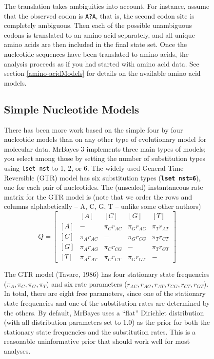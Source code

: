 \documentclass[12pt]{book}
\newcommand{\ttt}[1]{\texttt{#1}}
\newcommand{\tb}[1]{\ttt{\textbf{#1}}}
\begin{document}
\begin{figure}[h]
The translation takes ambiguities into account. For instance, assume that the observed codon is
\ttt{A?A}, that is, the second codon site is completely ambiguous. Then each of the possible
unambiguous codons is translated to an amino acid separately, and all unique amino acids are then
included in the final state set. Once the nucleotide sequences have been translated to amino acids,
the analysis proceeds as if you had started with amino acid data. See section
\ref{amino-acidModels} for details on the available amino acid models.

\subsection{Simple Nucleotide Models}

There has been more work based on the simple four by four nucleotide models than on any other type
of evolutionary model for molecular data. MrBayes 3 implements three main types of models; you
select among those by setting the number of substitution types using \ttt{lset nst} to 1, 2, or 6.
The widely used General Time Reversible (GTR) model has six substitution types (\tb{lset nst=6}),
one for each pair of nucleotides. The (unscaled) instantaneous rate matrix for the GTR model is
(note that we order the rows and columns alphabetically -- A, C, G, T -- unlike some other authors)
\[ Q=\begin{bmatrix}
    & [A] & [C] & [G] & [T]\\
    [A]& - & \pi_C r_{AC} & \pi_G r_{AG} & \pi_T r_{AT}\\
    [C]& \pi_A r_{AC} & - & \pi_G r_{CG} &\pi_T r_{CT}\\
    [G]& \pi_A r_{AG} & \pi_C r_{CG}& - & \pi_T r_{GT}\\
    [T]& \pi_A r_{AT} & \pi_C r_{CT}&\pi_G r_{GT} & -
\end{bmatrix}
\]

The GTR model (Tavare, 1986) has four stationary state frequencies ($\pi_A, \pi_C, \pi_G, \pi_T$)
and six rate parameters ($r_{AC}, r_{AG}, r_{AT}, r_{CG}, r_{CT}, r_{GT}$). In total, there are
eight free parameters, since one of the stationary state frequencies and one of the substitution
rates are determined by the others. By default, MrBayes uses a ``flat'' Dirichlet distribution
(with all distribution parameters set to $1.0$) as the prior for both the stationary state
frequencies and the substitution rates. This is a reasonable uninformative prior that should work
well for most analyses.


\end{figure}
\end{document}
